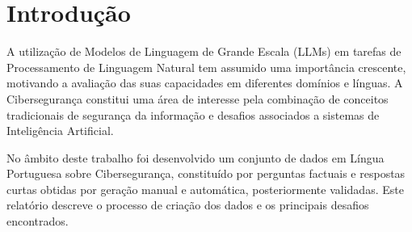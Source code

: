\section{Introdução} \label{sec:introducao}

A utilização de Modelos de Linguagem de Grande Escala (LLMs) em tarefas de Processamento de Linguagem Natural tem assumido uma importância crescente, motivando a avaliação das suas capacidades em diferentes domínios e línguas. A Cibersegurança constitui uma área de interesse pela combinação de conceitos tradicionais de segurança da informação e desafios associados a sistemas de Inteligência Artificial.

No âmbito deste trabalho foi desenvolvido um conjunto de dados em Língua Portuguesa sobre Cibersegurança, constituído por perguntas factuais e respostas curtas obtidas por geração manual e automática, posteriormente validadas. Este relatório descreve o processo de criação dos dados e os principais desafios encontrados.
